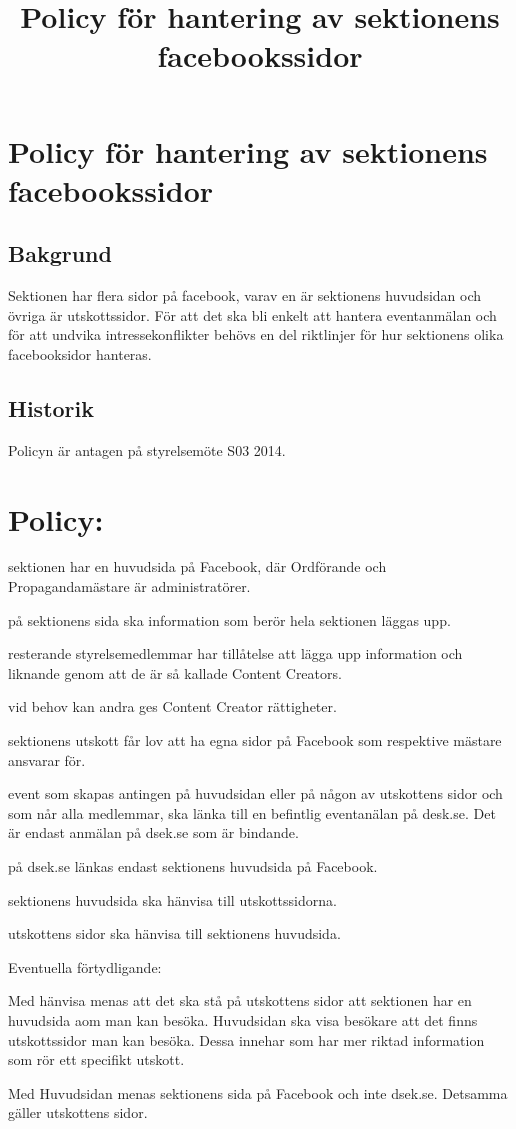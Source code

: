 \documentclass{dsekprotokoll}
\title{Policy för hantering av sektionens facebookssidor}
\author{}
\begin{document}
\section{Policy för hantering av sektionens facebookssidor}

\subsection{Bakgrund}

Sektionen har flera sidor på facebook, varav en är sektionens huvudsidan och övriga är utskottssidor. För att det ska bli enkelt att hantera eventanmälan och för att undvika intressekonflikter behövs en del riktlinjer för hur sektionens olika facebooksidor hanteras.

\subsection{Historik}
Policyn är antagen på styrelsemöte S03 2014.


\section{Policy:}
\begin{attlista}
	\item sektionen har en huvudsida på Facebook, där Ordförande och Propagandamästare är
	administratörer.
	\item på sektionens sida ska information som berör hela sektionen läggas upp.
	\item resterande styrelsemedlemmar har tillåtelse att lägga upp information och liknande genom att de är så kallade Content Creators.
	\item vid behov kan andra ges Content Creator rättigheter.
	\item  sektionens utskott får lov att ha egna sidor på Facebook som respektive mästare ansvarar
	för.
	\item event som skapas antingen på huvudsidan eller på någon av utskottens sidor och som
	når alla medlemmar, ska länka till en befintlig eventanälan på desk.se. Det är endast anmälan på dsek.se som är bindande.
	\item på dsek.se länkas endast sektionens huvudsida på Facebook.
	\item sektionens huvudsida ska hänvisa till utskottssidorna.
	\item utskottens sidor ska hänvisa till sektionens huvudsida.

\end{attlista}

Eventuella förtydligande:

Med hänvisa menas att det ska stå på utskottens sidor att sektionen har en huvudsida aom man
kan besöka. Huvudsidan ska visa besökare att det finns utskottssidor man kan besöka. Dessa
innehar som har mer riktad information som rör ett specifikt utskott.

Med Huvudsidan menas sektionens sida på Facebook och inte dsek.se. Detsamma gäller utskottens sidor.
\end{document}
